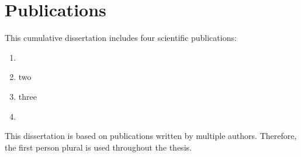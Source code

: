 \chapter*{Publications}

This cumulative dissertation includes four scientific publications:

\begin{enumerate}
    \item {}
    \item two
    \item three
    \item {}
\end{enumerate}

\bigskip
\noindent
This dissertation is based on publications written by multiple authors. 
Therefore, the first person plural is used throughout the thesis.
